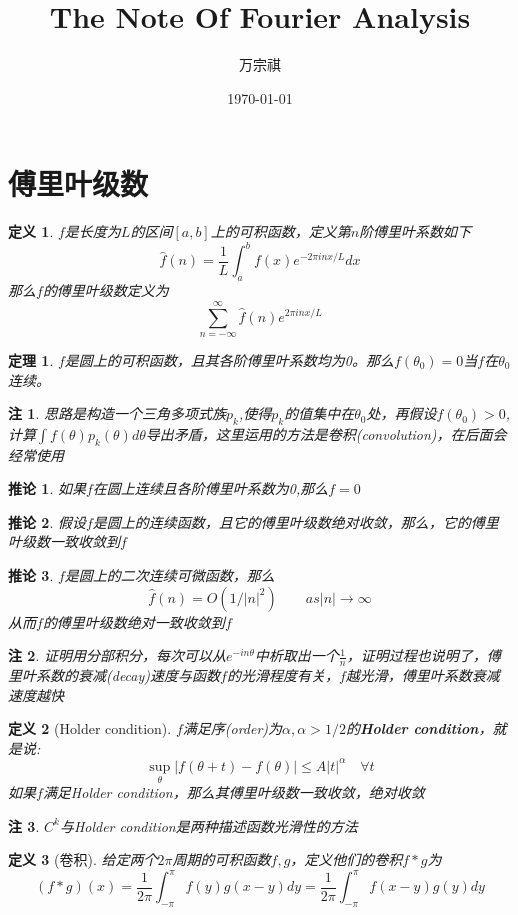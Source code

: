 \documentclass[UTF8]{ctexart}
\title{The Note Of  Fourier Analysis}
\author{万宗祺}
\date{\today}
\newtheorem{dfnt}{定义}
\newtheorem{thr}{定理}
\newtheorem{coro}{推论}
\newtheorem*{note}{注}
\begin{document}
\maketitle
\tableofcontents
\section{傅里叶级数}
\begin{dfnt}
$f$是长度为$L$的区间$[a,b]$上的可积函数，定义第$n$阶傅里叶系数如下$$\hat{f}(n)=\frac{1}{L}\int^b_a f(x) e^{-2\pi inx/L} dx$$那么$f$的傅里叶级数定义为$$\sum_{n=-\infty}^{\infty} \hat{f} (n) e^{2\pi i nx/L}$$
\end{dfnt}
\begin{thr}
$f$是圆上的可积函数，且其各阶傅里叶系数均为0。那么$f(\theta _0)=0$当$f$在$\theta _0$连续。
\end{thr}
\begin{note}
思路是构造一个三角多项式族$p_k$,使得$p_k$的值集中在$\theta _0$处，再假设$f(\theta _0) > 0$,计算$\int f(\theta) p_k(\theta) d\theta$导出矛盾，这里运用的方法是卷积(convolution)，在后面会经常使用
\end{note}
\begin{coro}
如果$f$在圆上连续且各阶傅里叶系数为0,那么$f=0$
\end{coro}
\begin{coro}
假设$f$是圆上的连续函数，且它的傅里叶级数绝对收敛，那么，它的傅里叶级数一致收敛到$f$
\end{coro}
\begin{coro}
$f$是圆上的二次连续可微函数，那么$$\hat{f} (n) = O(1/|n|^2) \quad \quad as |n| \rightarrow \infty$$从而$f$的傅里叶级数绝对一致收敛到$f$
\end{coro}
\begin{note}
证明用分部积分，每次可以从$e^{-in\theta}$中析取出一个$\frac{1}{n}$，证明过程也说明了，傅里叶系数的衰减(decay)速度与函数$f$的光滑程度有关，$f$越光滑，傅里叶系数衰减速度越快
\end{note}
\begin{dfnt}[Holder condition]
$f$满足序(order)为$\alpha,\alpha>1/2$的\textbf{Holder condition}，就是说:$$\sup _{\theta} |f(\theta + t)-f(\theta)| \leq A|t|^{\alpha} \quad \forall t$$如果$f$满足Holder condition，那么其傅里叶级数一致收敛，绝对收敛
\end{dfnt}
\begin{note}
$C^k$与Holder condition是两种描述函数光滑性的方法
\end{note}
\begin{dfnt}[卷积]
给定两个$2\pi$周期的可积函数$f,g$，定义他们的卷积$f*g$为$$(f*g)(x) = \frac{1}{2\pi}\int^{\pi}_{-\pi} f(y)g(x-y)dy = \frac{1}{2\pi}\int^{\pi}_{-\pi} f(x-y)g(y)dy$$
\end{dfnt}
\end{document}
